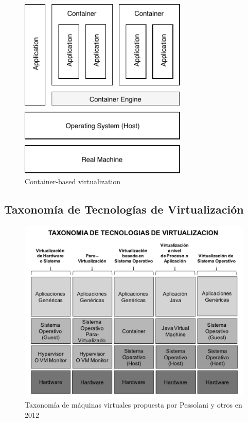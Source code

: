 \begin{figure}[ht] %
	\centering
	\includegraphics[width=8cm]{Pictures/container-baseVirtualization.pdf}
	\vspace{-0.2cm}
	\caption{Container-based virtualization}
	\label{fig:container-baseVirtualization}
\end{figure}


\subsection{Taxonomía de Tecnologías de Virtualización}



\begin{figure}[!htp]
	\centering
	\includegraphics[width=0.8 \linewidth]{Pictures/taxonomiaPessolani.png}
	\vspace{-0.2cm}
	\caption{Taxonomía de máquinas virtuales propuesta por Pessolani y otros en 2012\footnotemark[8]{}}
	\label{fig:taxonomiaPessolani}
\end{figure}

